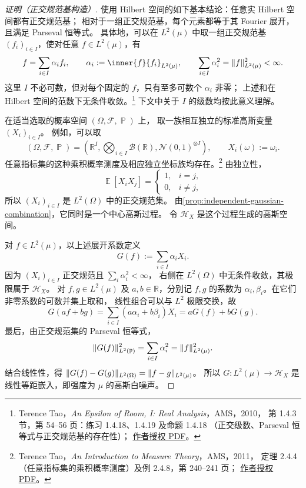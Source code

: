 \documentclass[UTF8,11pt,a4paper,oneside,fontset=fandol]{ctexrep}
\numberwithin{equation}{section}
\theoremstyle{plain}
\theoremstyle{definition}
\theoremstyle{remark}
\newcommand{\R}{\mathbb{R}}
\newcommand{\B}{\mathcal{B}}
\newcommand{\F}{\mathcal{F}}
\newcommand{\Hcal}{\mathcal{H}}
\DeclareMathOperator{\Prob}{\mathbb{P}}
\DeclareMathOperator{\E}{\mathbb{E}}
\DeclarePairedDelimiter{\norm}{\lVert}{\rVert}
\begin{document}
\begin{proof}[证明（正交规范基构造）]
使用 Hilbert 空间的如下基本结论：任意实 Hilbert 空间都有正交规范基；
相对于一组正交规范基，每个元素都等于其 Fourier 展开，且满足 Parseval 恒等式。
具体地，可以在 $L^2(\mu)$ 中取一组正交规范基 $(f_i)_{i\in I}$，使对任意
$f\in L^2(\mu)$，有
\[
  f=\sum_{i\in I}\alpha_i f_i,
  \qquad \alpha_i:=\inner{f}{f_i}_{L^2(\mu)},
  \qquad \sum_{i\in I}\alpha_i^2=\norm{f}_{L^2(\mu)}^2<\infty.
\]
这里 $I$ 不必可数，但对每个固定的 $f$，只有至多可数个 $\alpha_i$ 非零；
上述和在 Hilbert 空间的范数下无条件收敛。\footnote{%
Terence Tao，\emph{An Epsilon of Room, I: Real Analysis}，AMS，2010，
第 1.4.3 节，第 54--56 页：练习 1.4.18、1.4.19 及命题 1.4.18
（正交级数、Parseval 恒等式与正交规范基的存在性）；
\href{https://terrytao.wordpress.com/wp-content/uploads/2012/12/gsm-117-tao3-epsilon1.pdf}{作者授权 PDF}。}
下文中关于 $I$ 的级数均按此意义理解。

在适当选取的概率空间 $(\Omega,\F,\Prob)$ 上，
取一族相互独立的标准高斯变量 $(X_i)_{i\in I}$。
例如，可以取
\[
  (\Omega,\F,\Prob)
  =\left(\R^I,\bigotimes_{i\in I}\B(\R),
       \mathcal{N}(0,1)^{\otimes I}\right),
  \qquad X_i(\omega):=\omega_i.
\]
任意指标集的这种乘积概率测度及相应独立坐标族均存在。\footnote{%
Terence Tao，\emph{An Introduction to Measure Theory}，AMS，2011，
定理 2.4.4（任意指标集的乘积概率测度）及例 2.4.8，第 240--241 页；
\href{https://terrytao.wordpress.com/wp-content/uploads/2012/12/gsm-126-tao5-measure-book.pdf}{作者授权 PDF}。}
由独立性，
\[
  \E[X_iX_j]=\begin{cases}1,&i=j,\\0,&i\ne j,\end{cases}
\]
所以 $(X_i)_{i\in I}$ 是 $L^2(\Omega)$ 中的正交规范集。
由\cref{prop:independent-gaussian-combination}，它同时是一个中心高斯过程。
令 $\Hcal_X$ 是这个过程生成的高斯空间。

对 $f\in L^2(\mu)$，以上述展开系数定义
\[
  G(f):=\sum_{i\in I}\alpha_iX_i.
\]
因为 $(X_i)_{i\in I}$ 正交规范且 $\sum_i\alpha_i^2<\infty$，
右侧在 $L^2(\Omega)$ 中无条件收敛，其极限属于 $\Hcal_X$。
对 $f,g\in L^2(\mu)$ 及 $a,b\in\R$，分别记 $f,g$ 的系数为
$\alpha_i,\beta_i$。在它们非零系数的可数并集上取和，
线性组合可以与 $L^2$ 极限交换，故
\[
  G(af+bg)=\sum_{i\in I}(a\alpha_i+b\beta_i)X_i
  =aG(f)+bG(g).
\]
最后，由正交规范集的 Parseval 恒等式，
\[
  \norm{G(f)}_{L^2(\Prob)}^2
  =\sum_{i\in I}\alpha_i^2
  =\norm{f}_{L^2(\mu)}^2.
\]
结合线性性，得 $\norm{G(f)-G(g)}_{L^2(\Omega)}=\norm{f-g}_{L^2(\mu)}$。
所以 $G:L^2(\mu)\to\Hcal_X$ 是线性等距嵌入，即强度为 $\mu$ 的高斯白噪声。
\end{proof}
\end{document}
